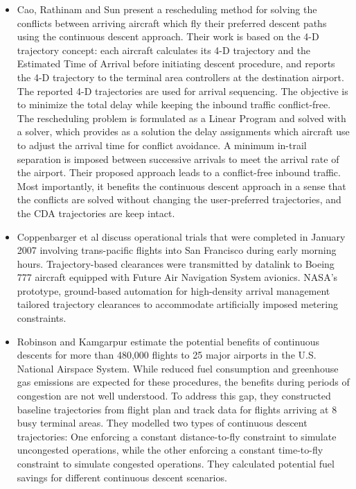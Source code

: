 \documentclass{aer1315-pretty}
\begin{document}
\begin{itemize}
\item Cao, Rathinam and Sun \cite{Cao:2011} present a rescheduling method for solving the conflicts between arriving aircraft which fly their preferred descent paths using the continuous descent approach. Their work is based on the 4-D trajectory concept: each aircraft calculates its 4-D trajectory and the Estimated Time of Arrival before initiating descent procedure, and reports the 4-D trajectory to the terminal area controllers at the destination airport. The reported 4-D trajectories are used for arrival sequencing. The objective is to minimize the total delay while keeping the inbound traffic conflict-free. The rescheduling problem is formulated as a Linear Program and solved with a solver, which provides as a solution the delay assignments which aircraft use to adjust the arrival time for conflict avoidance. A minimum in-trail separation is imposed between successive arrivals to meet the arrival rate of the airport. Their proposed approach leads to a conflict-free inbound traffic. Most importantly, it benefits the continuous descent approach in a sense that the conflicts are solved without changing the user-preferred trajectories, and the CDA trajectories are keep intact. 


\item Coppenbarger et al \cite{Copp:2007} discuss operational trials that were completed in January 2007 involving trans-pacific flights into San Francisco during early morning hours. Trajectory-based clearances were transmitted by datalink to Boeing 777 aircraft equipped with Future Air Navigation System avionics. NASA’s prototype, ground-based automation for high-density arrival management tailored trajectory clearances to accommodate artificially imposed metering constraints. 

\item Robinson and Kamgarpur \cite{Rob:2010} estimate the potential benefits of continuous descents for more than 480,000 flights to 25 major airports in the U.S. National Airspace System. While reduced fuel consumption and greenhouse gas emissions are expected for these procedures, the benefits during periods of congestion are not well understood. To address this gap, they constructed baseline trajectories  from flight plan and track data for flights arriving at 8 busy terminal areas. They modelled two types of continuous descent trajectories: One enforcing a constant distance-to-fly constraint to simulate uncongested operations, while the other enforcing a constant time-to-fly constraint to simulate congested operations. They calculated potential fuel savings for different continuous descent scenarios. 


\end{itemize}
\end{document}
